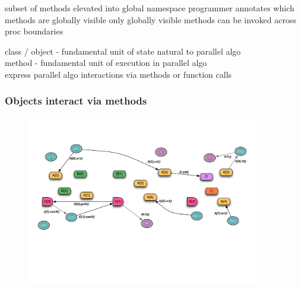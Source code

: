 \begin{frame}
subset of methods elevated into global namespace
programmer annotates which methods are globally visible
only globally visible methods can be invoked across proc boundaries
\end{frame}


\begin{frame}
    class / object - fundamental unit of state natural to parallel algo\\
    method - fundamental unit of execution in parallel algo\\
    express parallel algo interactions via methods or function calls
\end{frame}


\begin{frame}
  \frametitle{Objects interact via methods}
  \begin{figure}
    \includegraphics[width=0.9\textwidth]{../figures/progmodel/07-algo-via-objects-methods.pdf}
  \end{figure}
\end{frame}


